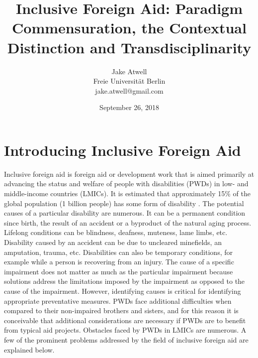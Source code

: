 \documentclass[a4paper]{article}
\begin{document}
\title{Inclusive Foreign Aid: Paradigm Commensuration, the Contextual
Distinction and Transdisciplinarity}
\author{Jake Atwell\\
    Freie Universität Berlin\\
    jake.atwell@gmail.com
}
\date{September 26, 2018}

\maketitle



\newpage


\tableofcontents

\newpage
{} %




\section{Introducing Inclusive Foreign Aid}

Inclusive foreign aid is foreign aid or development work that is aimed
primarily at advancing the status and welfare of people with disabilities
(PWDs) in low- and middle-income countries (LMICs). It is estimated that
approximately 15\% of the global population (1 billion people) has some form
of disability \citep{banks2017poverty}. The potential causes of a particular
disability are numerous. It can be a permanent condition since birth, the
result of an accident or a byproduct of the natural aging process. Lifelong
conditions can be blindness, deafness, muteness, lame limbs, etc. Disability
caused by an accident can be due to uncleared minefields, an amputation,
trauma, etc. Disabilities can also be temporary conditions, for example while
a person is recovering from an injury. The cause of a specific impairment does
not matter as much as the particular impairment because solutions address the
limitations imposed by the impairment as opposed to the cause of the
impairment. However, identifying causes is critical for identifying
appropriate preventative measures. PWDs face additional difficulties when
compared to their non-impaired brothers and sisters, and for this reason it is
conceivable that additional considerations are necessary if PWDs are to
benefit from typical aid projects. Obstacles faced by PWDs in LMICs are
numerous. A few of the prominent problems addressed by the field of inclusive
foreign aid are explained below.
\end{document}
